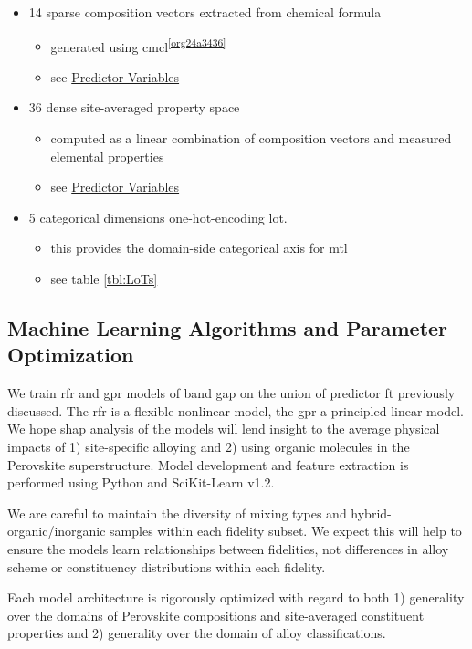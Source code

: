 \documentclass[aip, jmp, amsmath, amssymb, nofootinbib]{revtex4-2}
\begin{document}
\begin{itemize}
\item 14 sparse composition vectors extracted from chemical formula
\begin{itemize}
\item generated using cmcl\textsuperscript{\ref{org24a3436}}
\item see \hyperref[sec:orge09f193]{Predictor Variables}
\end{itemize}
\item 36 dense site-averaged property space
\begin{itemize}
\item computed as a linear combination of composition vectors and
measured elemental properties\cite{mentel-2014}
\item see \hyperref[sec:orge09f193]{Predictor Variables}
\end{itemize}
\item 5 categorical dimensions one-hot-encoding \gls{lot}.
\begin{itemize}
\item this provides the domain-side categorical axis for \gls{mtl}
\item see table \ref{tbl:LoTs}
\end{itemize}
\end{itemize}

\subsection*{Machine Learning Algorithms and Parameter Optimization}
\label{sec:orgb7d8858}
We train \acrshort{rfr} and \acrshort{gpr} models of band gap on the union of predictor
\gls{ft} previously discussed. The \acrshort{rfr} is a flexible nonlinear model,
the \acrshort{gpr} a principled linear model. We hope \Acrfull{shap} analysis of the models will lend insight to the
average physical impacts of 1) site-specific alloying and 2) using
organic molecules in the Perovskite superstructure.  Model development
and feature extraction is performed using Python and
SciKit-Learn\cite{pedregosa-2011-scikit-learn} v1.2.

We are careful to maintain the diversity of mixing types and
hybrid-organic/inorganic samples within each fidelity subset. We
expect this will help to ensure the models learn relationships between
fidelities, not differences in alloy scheme or constituency
distributions within each fidelity.

Each model architecture is rigorously optimized with regard to both 1)
generality over the domains of Perovskite compositions and
site-averaged constituent properties and 2) generality over the domain
of alloy classifications.
\end{document}
